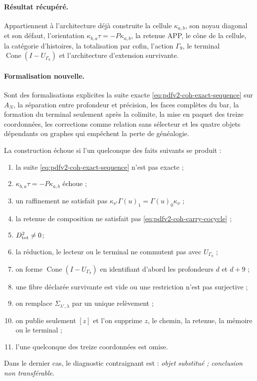 \paragraph{Résultat récupéré.}
Appartiennent à l'architecture déjà construite la cellule \(\kappa_{a,b}\), son
noyau diagonal et son défaut, l'orientation
\(\kappa_{b,a}\tau=-P\kappa_{a,b}\), la retenue APP, le cône de la cellule, la
catégorie d'histoires, la totalisation par cofin, l'action \(\Gamma_9\), le
terminal \(\operatorname{Cone}(I-U_{\Gamma_9})\) et l'architecture
d'extension survivante.

\paragraph{Formalisation nouvelle.}
Sont des formalisations explicites la suite exacte
\eqref{eq:pdfv2-coh-exact-sequence} sur \(A_N\), la séparation entre
profondeur et précision, les faces complètes du bar, la formation du
terminal seulement après la colimite, la mise en paquet des treize coordonnées,
les corrections comme relation sans sélecteur et les quatre objets dépendants
ou graphes qui empêchent la perte de généalogie.

\begin{criterion}
\label{crit:pdfv2-coh-falsifiers}
La construction échoue si l'un quelconque des faits suivants se produit :
\begin{enumerate}
 \item la suite
       \eqref{eq:pdfv2-coh-exact-sequence} n'est pas exacte ;
 \item \(\kappa_{b,a}\tau=-P\kappa_{a,b}\) échoue ;
 \item un raffinement ne satisfait pas
       \(\kappa_{\nu'}\Gamma(u)_1=\Gamma(u)_0\kappa_\nu\) ;
 \item la retenue de composition ne satisfait pas
       \eqref{eq:pdfv2-coh-carry-cocycle} ;
 \item \(D_{\rm tot}^2\neq0\);
 \item la réduction, le lecteur ou le terminal ne commutent pas avec \(U_{\Gamma_9}\) ;
 \item on forme \(\operatorname{Cone}(I-U_{\Gamma_9})\) en identifiant d'abord
       les profondeurs \(d\) et \(d+9\) ;
 \item une fibre déclarée survivante est vide ou une restriction n'est pas
       surjective ;
 \item on remplace \(\Sigma_{\lambda',\lambda}\) par un unique
       relèvement ;
 \item on publie seulement \([z]\) et l'on supprime \(z\), le chemin, la retenue, la mémoire ou
       le terminal ;
 \item l'une quelconque des treize coordonnées est omise.
\end{enumerate}
Dans le dernier cas, le diagnostic contraignant est : \emph{objet substitué ;
conclusion non transférable}.
\end{criterion}

